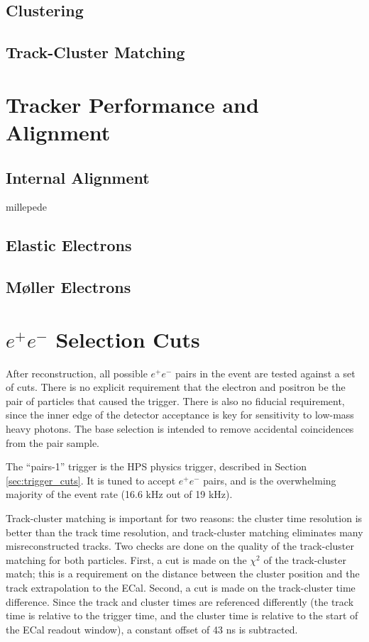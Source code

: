 \subsection{Clustering}
\label{sec:clustering}

\subsection{Track-Cluster Matching}
\label{sec:matching}
\section{Tracker Performance and Alignment}
\subsection{Internal Alignment}
millepede
\subsection{Elastic Electrons}
\label{sec:target_z}
\subsection{M{\o}ller Electrons}
\label{sec:mollers}

\section{\texorpdfstring{$e^+e^-$}{e+e-} Selection Cuts}
\label{sec:event_selection}
After reconstruction, all possible $e^+e^-$ pairs in the event are tested against a set of cuts.
There is no explicit requirement that the electron and positron be the pair of particles that caused the trigger.
There is also no fiducial requirement, since the inner edge of the detector acceptance is key for sensitivity to low-mass heavy photons.
The base selection is intended to remove accidental coincidences from the pair sample.

The ``pairs-1'' trigger is the HPS physics trigger, described in Section \ref{sec:trigger_cuts}.
It is tuned to accept $e^+e^-$ pairs, and is the overwhelming majority of the event rate (16.6 kHz out of 19 kHz).

Track-cluster matching is important for two reasons: the cluster time resolution is better than the track time resolution, and track-cluster matching eliminates many misreconstructed tracks.
Two checks are done on the quality of the track-cluster matching for both particles.
First, a cut is made on the $\chi^2$ of the track-cluster match; this is a requirement on the distance between the cluster position and the track extrapolation to the ECal.
Second, a cut is made on the track-cluster time difference.
Since the track and cluster times are referenced differently (the track time is relative to the trigger time, and the cluster time is relative to the start of the ECal readout window), a constant offset of 43 ns is subtracted.

